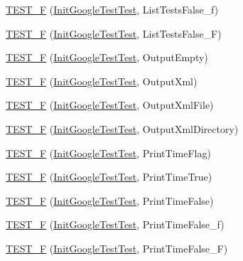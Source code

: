 \begin{DoxyCompactItemize}
\item 
\hyperlink{namespacetesting_a60e2b7e1cf88c2af6e04055b3afe7cbe}{\-T\-E\-S\-T\-\_\-\-F} (\hyperlink{classtesting_1_1InitGoogleTestTest}{\-Init\-Google\-Test\-Test}, \-List\-Tests\-False\-\_\-f)
\item 
\hyperlink{namespacetesting_a4933b012108ecb88243c2dbc13d7665b}{\-T\-E\-S\-T\-\_\-\-F} (\hyperlink{classtesting_1_1InitGoogleTestTest}{\-Init\-Google\-Test\-Test}, \-List\-Tests\-False\-\_\-\-F)
\item 
\hyperlink{namespacetesting_a121894d4edf72b1dbabdcde2bebd745d}{\-T\-E\-S\-T\-\_\-\-F} (\hyperlink{classtesting_1_1InitGoogleTestTest}{\-Init\-Google\-Test\-Test}, \-Output\-Empty)
\item 
\hyperlink{namespacetesting_a90df70c45f67d4c0dbc5bd29f7be3361}{\-T\-E\-S\-T\-\_\-\-F} (\hyperlink{classtesting_1_1InitGoogleTestTest}{\-Init\-Google\-Test\-Test}, \-Output\-Xml)
\item 
\hyperlink{namespacetesting_a810f99da1185404f8a899c919ee6433e}{\-T\-E\-S\-T\-\_\-\-F} (\hyperlink{classtesting_1_1InitGoogleTestTest}{\-Init\-Google\-Test\-Test}, \-Output\-Xml\-File)
\item 
\hyperlink{namespacetesting_ac351c3065ee89f7eb2fbba809db5c61d}{\-T\-E\-S\-T\-\_\-\-F} (\hyperlink{classtesting_1_1InitGoogleTestTest}{\-Init\-Google\-Test\-Test}, \-Output\-Xml\-Directory)
\item 
\hyperlink{namespacetesting_aa832ff8ffe6b687c7025cbc766973e0b}{\-T\-E\-S\-T\-\_\-\-F} (\hyperlink{classtesting_1_1InitGoogleTestTest}{\-Init\-Google\-Test\-Test}, \-Print\-Time\-Flag)
\item 
\hyperlink{namespacetesting_ae0f76bbca8e2bf7d9de60c4b8b0dfa16}{\-T\-E\-S\-T\-\_\-\-F} (\hyperlink{classtesting_1_1InitGoogleTestTest}{\-Init\-Google\-Test\-Test}, \-Print\-Time\-True)
\item 
\hyperlink{namespacetesting_a1ec71efef2639ccb137ac5b7ccd8c9d1}{\-T\-E\-S\-T\-\_\-\-F} (\hyperlink{classtesting_1_1InitGoogleTestTest}{\-Init\-Google\-Test\-Test}, \-Print\-Time\-False)
\item 
\hyperlink{namespacetesting_af87ac7e6dc7c0ea1d85eaa3a57358d29}{\-T\-E\-S\-T\-\_\-\-F} (\hyperlink{classtesting_1_1InitGoogleTestTest}{\-Init\-Google\-Test\-Test}, \-Print\-Time\-False\-\_\-f)
\item 
\hyperlink{namespacetesting_a337ddb6629adb42219e612b67d18c6f1}{\-T\-E\-S\-T\-\_\-\-F} (\hyperlink{classtesting_1_1InitGoogleTestTest}{\-Init\-Google\-Test\-Test}, \-Print\-Time\-False\-\_\-\-F)
\item 

\end{DoxyCompactItemize}
